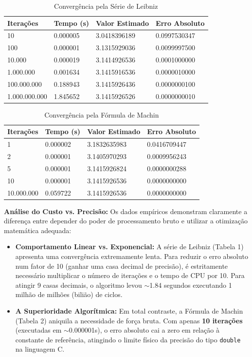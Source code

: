 \documentclass[a4paper,12pt]{article}
\begin{document}
\begin{table}[H]
\centering
\caption{Convergência pela Série de Leibniz}
\begin{tabular}{@{}llll@{}}
\toprule
Iterações & Tempo (s) & Valor Estimado & Erro Absoluto \\ \midrule
10 & 0.000005 & 3.0418396189 & 0.0997530347 \\
100 & 0.000001 & 3.1315929036 & 0.0099997500 \\
10.000 & 0.000019 & 3.1414926536 & 0.0001000000 \\
1.000.000 & 0.001634 & 3.1415916536 & 0.0000010000 \\
100.000.000 & 0.188943 & 3.1415926436 & 0.0000000100 \\
1.000.000.000 & 1.845652 & 3.1415926526 & 0.0000000010 \\ \bottomrule
\end{tabular}
\end{table}

\begin{table}[H]
\centering
\caption{Convergência pela Fórmula de Machin}
\begin{tabular}{@{}llll@{}}
\toprule
Iterações & Tempo (s) & Valor Estimado & Erro Absoluto \\ \midrule
1 & 0.000002 & 3.1832635983 & 0.0416709447 \\
2 & 0.000001 & 3.1405970293 & 0.0009956243 \\
5 & 0.000001 & 3.1415926824 & 0.0000000288 \\
10 & 0.000001 & 3.1415926536 & 0.0000000000 \\
10.000.000 & 0.059722 & 3.1415926536 & 0.0000000000 \\ \bottomrule
\end{tabular}
\end{table}

\textbf{Análise do Custo vs. Precisão:}
Os dados empíricos demonstram claramente a diferença entre depender do poder de processamento bruto e utilizar a otimização matemática adequada:

\begin{itemize}
    \item \textbf{Comportamento Linear vs. Exponencial:} A série de Leibniz (Tabela 1) apresenta uma convergência extremamente lenta. Para reduzir o erro absoluto num fator de 10 (ganhar uma casa decimal de precisão), é estritamente necessário multiplicar o número de iterações e o tempo de CPU por 10. Para atingir 9 casas decimais, o algoritmo levou $\sim$1.84 segundos executando 1 milhão de milhões (bilião) de ciclos.
    \item \textbf{A Superioridade Algorítmica:} Em total contraste, a Fórmula de Machin (Tabela 2) aniquila a necessidade de força bruta. Com apenas \textbf{10 iterações} (executadas em $\sim$0.000001s), o erro absoluto cai a zero em relação à constante de referência, atingindo o limite físico da precisão do tipo \texttt{double} na linguagem C.
\end{itemize}
\end{document}
